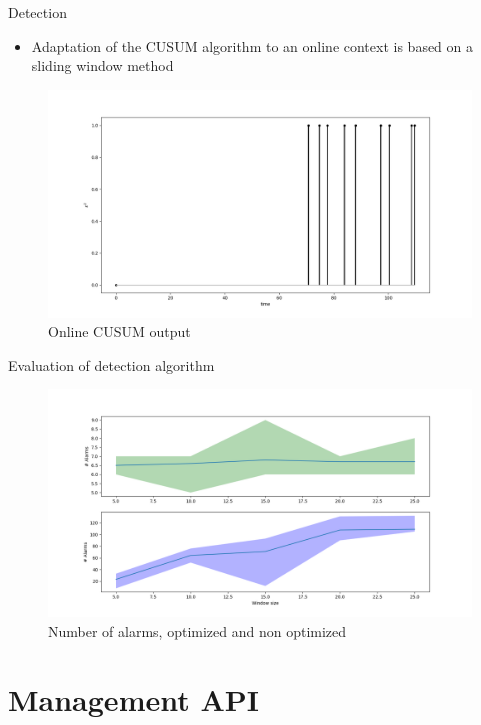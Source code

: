 \documentclass{beamer}
\begin{document}
\begin{frame}{Detection}
    \begin{itemize}
        \item Adaptation of the CUSUM algorithm to an online context is based on a sliding window
            method 
    \end{itemize}
    \pause
    \begin{figure}
        \includegraphics[width=.7\textwidth]{meter_eleph/online_cusum_output}
        \caption{Online CUSUM output}
    \end{figure}
\end{frame}

\begin{frame}{Evaluation of detection algorithm}
    \begin{figure}
        \includegraphics[width=.9\textwidth]{meter_eleph/evaluation_error}
        \caption{Number of alarms, optimized and non optimized}
    \end{figure}
\end{frame}

\section{Management API}
\end{document}
